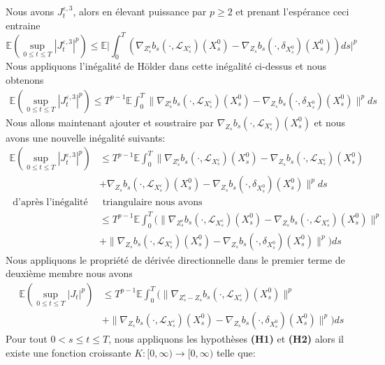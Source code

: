 \documentclass[12pt,a4paper,twoside,fleqn]{book}%
\theoremstyle{definition}
\theoremstyle{lemme}
\numberwithin{equation}{section}
\begin{document}
Nous avons $J_t^{\varepsilon,3}$, alors en élevant puissance par $p\geq2$ et prenant l'espérance ceci entraine  
\[
\mathbb{E}\left(\sup_{0\leq t \leq T}|J_t^{\varepsilon,3}|^p\right)\leq\mathbb{E}\Big|\int_{0}^{T}\left(\nabla_{Z_s^\varepsilon}b_s(\cdot, \mathcal{L}_{X_s^\varepsilon})(X_s^0) - \nabla_{Z_s}b_s(\cdot, \delta_{X_s^0})(X_s^0)\right)ds\Big|^p
\]
Nous appliquons l'inégalité de Hölder dans cette inégalité ci-dessus et nous obtenons
\[
\begin{aligned}
\mathbb{E}\left(\sup_{0\leq t \leq T}|J_t^{\varepsilon,3}|^p\right)\leq T^{p-1}\mathbb{E}\int_{0}^{T}\Big\|\nabla_{Z_s^\varepsilon}b_s(\cdot, \mathcal{L}_{X_s^\varepsilon})(X_s^0) - \nabla_{Z_s}b_s(\cdot, \delta_{X_s^0})(X_s^0)\Big\|^pds
\end{aligned}
\]
Nous allons maintenant ajouter et soustraire par $\nabla_{Z_s}b_s(\cdot,\mathcal{L}_{X_s^\varepsilon})(X_s^0)$ et nous avons une nouvelle inégalité suivants:
\[
\begin{aligned}
\mathbb{E}\left(\sup_{0\leq t \leq T}|J_t^{\varepsilon,3}|^p\right)
&\leq T^{p-1}\mathbb{E}\int_{0}^{T}\Big\|\nabla_{Z_s^\varepsilon}b_s(\cdot, \mathcal{L}_{X_s^\varepsilon})(X_s^0) -\nabla_{Z_s}b_s(\cdot,\mathcal{L}_{X_s^\varepsilon})(X_s^0)  \\&+ \nabla_{Z_s}b_s(\cdot,\mathcal{L}_{X_s^\varepsilon})(X_s^0) - \nabla_{Z_s}b_s(\cdot, \delta_{X_s^0})(X_s^0)\Big\|^pds\\
\text{ d'après l'inégalité}&\text{ triangulaire nous avons}\\
&\leq T^{p-1}\mathbb{E}\int_{0}^{T}\Big(\Big\|\nabla_{Z_s^\varepsilon}b_s(\cdot, \mathcal{L}_{X_s^\varepsilon})(X_s^0) -\nabla_{Z_s}b_s(\cdot,\mathcal{L}_{X_s^\varepsilon})(X_s^0)\Big\|^p\\
&+ \Big\|\nabla_{Z_s}b_s(\cdot,\mathcal{L}_{X_s^\varepsilon})(X_s^0) - \nabla_{Z_s}b_s(\cdot, \delta_{X_s^0})(X_s^0)\Big\|^p\Big)ds
\end{aligned}
\]
Nous appliquons le propriété de dérivée directionnelle dans le premier terme de deuxième membre nous avons
\[
\begin{aligned}
	\mathbb{E}\left(\sup_{0\leq t \leq T}|J_t|^p\right)
	&\leq T^{p-1} \mathbb{E}\int_{0}^{T}\Big(\Big\|\nabla_{Z_s^\varepsilon-Z_s}b_s(\cdot, \mathcal{L}_{X_s^\varepsilon})(X_s^0)\Big\|^p\\ &+ \Big\|\nabla_{Z_s}b_s(\cdot,\mathcal{L}_{X_s^\varepsilon})(X_s^0) - \nabla_{Z_s}b_s(\cdot, \delta_{X_s^0})(X_s^0)\Big\|^p\Big)ds
\end{aligned}
\]
Pour tout $0< s\leq t\leq T$, nous appliquons les hypothèses \textbf{(H1)} et \textbf{(H2)} alors il existe une fonction croissante $K:  [0,\infty)\to [0,\infty)$ telle que:
\end{document}
